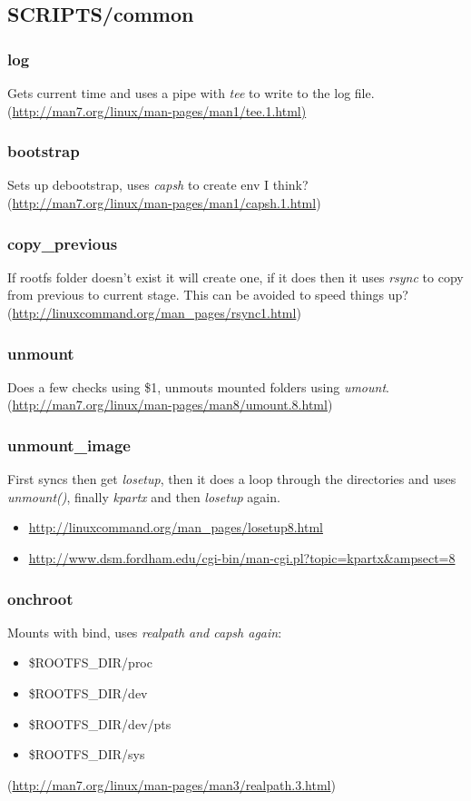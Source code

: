 \documentclass[12pt,a4paper]{report}
\begin{document}
\subsection{SCRIPTS/common}
\subsubsection{log}
Gets current time and uses a pipe with \textit{tee} to write to the log file. 
\\(\url{http://man7.org/linux/man-pages/man1/tee.1.html)}
\subsubsection{bootstrap}
Sets up debootstrap, uses \textit{capsh} to create env I think? 
\\(\url{http://man7.org/linux/man-pages/man1/capsh.1.html})
\subsubsection{copy\_previous}
If rootfs folder doesn't exist it will create one, if it does then it uses \textit{rsync} to copy from previous to current stage. This can be avoided to speed things up?
\\(\url{http://linuxcommand.org/man_pages/rsync1.html})
\subsubsection{unmount}
Does a few checks using \$1, unmouts mounted folders using \textit{umount}.
\\(\url{http://man7.org/linux/man-pages/man8/umount.8.html})
\subsubsection{unmount\_image}
First syncs then get \textit{losetup}, then it does a loop through the directories and uses \textit{unmount()}, finally \textit{kpartx} and then \textit{losetup} again.
\begin{itemize}
\item{\url{http://linuxcommand.org/man_pages/losetup8.html}}
\item{\url{http://www.dsm.fordham.edu/cgi-bin/man-cgi.pl?topic=kpartx&ampsect=8}}
\end{itemize}
\subsubsection{onchroot}
Mounts with bind, uses \textit{realpath and \textit{capsh} again}:
\begin{itemize}
\item{\${ROOTFS\_DIR}/proc}
\item{\${ROOTFS\_DIR}/dev}
\item{\${ROOTFS\_DIR}/dev/pts}
\item{\${ROOTFS\_DIR}/sys}
\end{itemize}
(\url{http://man7.org/linux/man-pages/man3/realpath.3.html})
\end{document}
